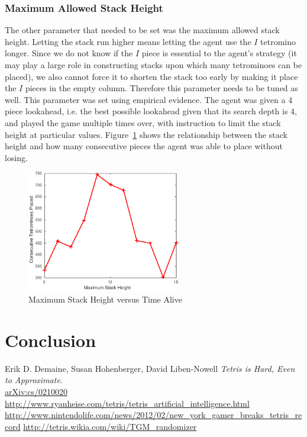 \documentclass[fontsize=12pt]{article}
\begin{document}
\subsubsection{Maximum Allowed Stack Height}
\label{ssub:maximum_allowed_stack_height}
\par The other parameter that needed to be set was the maximum allowed stack height. Letting the stack run higher means letting the agent use the $I$ tetromino longer. Since we do not know if the $I$ piece is essential to the agent's strategy (it may play a large role in constructing stacks upon which many tetrominoes can be placed), we also cannot force it to shorten the stack too early by making it place the $I$ pieces in the empty column. Therefore this parameter needs to be tuned as well. This parameter was set using empirical evidence. The agent was given a 4 piece lookahead, i.e. the best possible lookahead given that its search depth is 4, and played the game multiple times over, with instruction to limit the stack height at particular values. Figure~\ref{fig:maximum_stack_height_vs_time_alive} shows the relationship between the stack height and how many consecutive pieces the agent was able to place without losing.

\begin{figure}[H]
  \centering
  \includegraphics[width=0.6\textwidth]{figures/height_v_time_d4}
  \caption{Maximum Stack Height versus Time Alive}
  \label{fig:maximum_stack_height_vs_time_alive}
\end{figure}

\section{Conclusion}
\label{sec:conclusion}



\newpage


\begin{thebibliography}{9}
Erik D. Demaine, Susan Hohenberger, David Liben-Nowell
\textit{
Tetris is Hard, Even to Approximate}.
\\\href{https://arxiv.org/abs/cs/0210020}{arXiv:cs/0210020}
  \url{http://www.ryanheise.com/tetris/tetris_artificial_intelligence.html}
  \url{http://www.nintendolife.com/news/2012/02/new_york_gamer_breaks_tetris_record}
  \url{http://tetris.wikia.com/wiki/TGM_randomizer}
\end{thebibliography}
\end{document}
